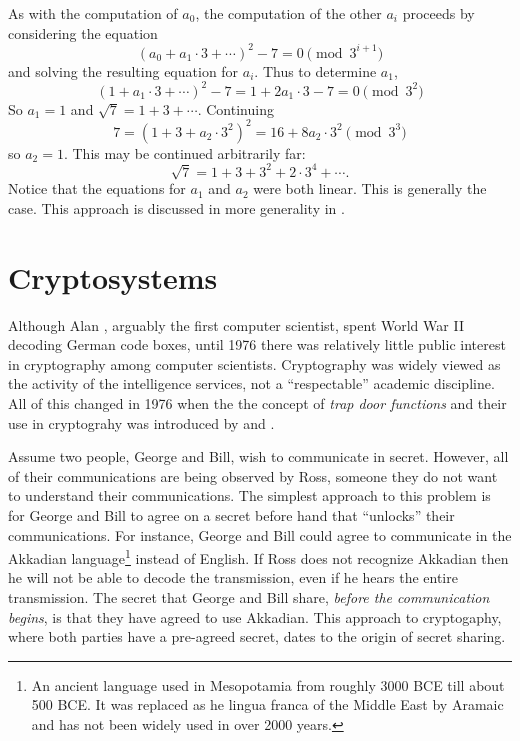 As with the computation of $a_0$, the computation of the other $a_i$
proceeds by considering the equation
\[
(a_0 + a_1 \cdot 3 + \cdots)^2 - 7 = 0 \pmod{3^{i+1}}
\]
and solving the resulting equation for $a_i$.  Thus to determine
$a_1$,
\[
(1 + a_1 \cdot 3 + \cdots)^2 - 7 = 
   1 +2 a_1 \cdot 3 - 7 = 0 \pmod{3^2}
\]
So $a_1 = 1$ and $\sqrt{7} = 1 + 3 + \cdots.$
Continuing
\[
7 = (1+ 3+ a_2 \cdot 3^2)^2 = 16 + 8a_2 \cdot 3^2 \pmod{3^3}
\]
so $a_2 = 1$.  This may be continued arbitrarily far:
\[
\sqrt{7} = 1 + 3 + 3^2 + 2 \cdot 3^4 + \cdots.
\]
Notice that the equations for $a_1$ and $a_2$ were both linear.  This
is generally the case.  This approach is discussed in more generality
in .


\section{Cryptosystems}
\label{Crypto:Sec}

Although Alan {\Turing}, arguably the first
computer scientist, spent World War II decoding German code boxes,
until 1976 there was relatively little public interest in cryptography
among computer scientists.  Cryptography was widely viewed as the
activity of the intelligence services, not a ``respectable'' academic
discipline.  All of this changed in 1976 when the the concept of {\em trap
door functions} and their use in
cryptograhy was introduced by {\Diffie} and {\Hellman} \cite{Diffie1976-it}.

Assume two people, George and Bill, wish to communicate in secret.
However, all of their communications are being observed by Ross,
someone they do not want to understand their communications.  The
simplest approach to this problem is for George and Bill to agree on a
secret before hand that ``unlocks'' their communications.  For
instance, George and Bill could agree to communicate in the
Akkadian language\footnote{An ancient language used in Mesopotamia from roughly
  3000 BCE till about 500 BCE. It was replaced as he lingua franca of
  the Middle East by Aramaic and has not been widely used in over 2000 years.}
instead of English.  If Ross does not recognize Akkadian then he will
not be able to decode the transmission, even if he hears the entire
transmission.  The secret that George and Bill share, {\em before the
communication begins\/}, is that they have agreed to use Akkadian.
This approach to cryptogaphy, where both parties have a pre-agreed
secret, dates to the origin of secret sharing. 

